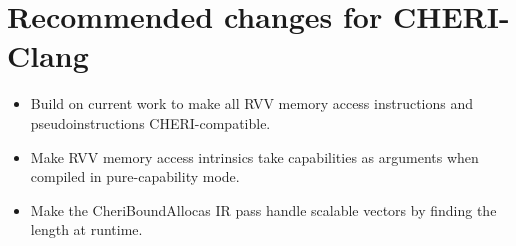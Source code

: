 \section{Recommended changes for CHERI-Clang}\label{chap:software:sec:chericlangchanges}
\begin{itemize}
    \item Build on current work to make all RVV memory access instructions and pseudoinstructions CHERI-compatible.
    \item Make RVV memory access intrinsics take capabilities as arguments when compiled in pure-capability mode.
    \item Make the CheriBoundAllocas IR pass handle scalable vectors by finding the length at runtime.
\end{itemize}
